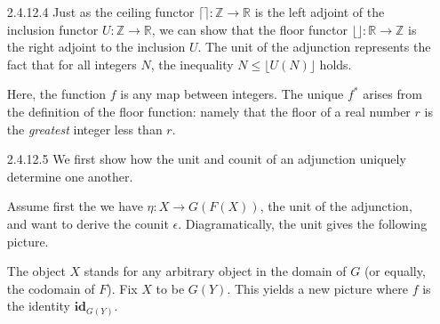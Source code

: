 \documentclass{article}
\newcommand{\ccat}{\mathbf{C}}
\newcommand{\dcat}{\mathbf{D}}
\newcommand{\id}{\mathbf{id}}
\newcommand{\ints}{\mathbb{Z}}
\newcommand{\reals}{\mathbb{R}}
\newcommand{\ceil}[1]{\lceil #1 \rceil}
\newcommand{\floor}[1]{\lfloor #1 \rfloor}
\begin{document}
\begin{enumerate}
\vfill{}
\item[2.4.12.4]
  Just as the ceiling functor $\ceil{} : \ints \rightarrow \reals$ is the left adjoint of the inclusion functor $U : \ints \rightarrow \reals$, we can show that the floor functor $\floor{} : \reals \rightarrow \ints$ is the right adjoint to the inclusion $U$.
  The unit of the adjunction represents the fact that for all integers $N$, the inequality $N \le \floor{U(N)}$ holds.
  \begin{center}
  \end{center}
  Here, the function $f$ is any map between integers.
  The unique $f^*$ arises from the definition of the floor function: namely that the floor of a real number $r$ is the \emph{greatest} integer less than $r$.

\vfill{}
\newpage
\item[2.4.12.5]
  We first show how the unit and counit of an adjunction uniquely determine one another.

  Assume first the we have $\eta : X \rightarrow G(F(X))$, the unit of the adjunction, and want to derive the counit $\epsilon$.
  Diagramatically, the unit gives the following picture.
  \begin{center}
  \end{center}
  The object $X$ stands for any arbitrary object in the domain of $G$ (or equally, the codomain of $F$).
  Fix $X$ to be $G(Y)$.
  This yields a new picture where $f$ is the identity $\id_{G(Y)}$.
  \begin{center}
\end{center}
\end{enumerate}
\end{document}
